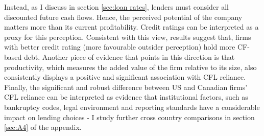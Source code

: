 \documentclass[12pt]{article}
\begin{document}
Instead, as I discuss in section \ref{sec:loan rates}, lenders must consider all discounted future cash flows. Hence, the perceived potential of the company matters more than its current profitability. Credit ratings can be interpreted as a proxy for this perception. Consistent with this view, results suggest that, firms with better credit rating (more favourable outsider perception) hold more CF-based debt. Another piece of evidence that points in this direction is that productivity, which measures the added value of the firm relative to its size, also consistently displays a positive and significant association with CFL reliance.  \vspace{3mm} \\
Finally, the significant and robust difference between US and Canadian firms' CFL reliance can be interpreted as evidence that institutional factors, such as bankruptcy codes, legal environment and reporting standards have a considerable impact on lending choices - I study further cross country comparisons in section \ref{sec:A4} of the appendix.
\end{document}
